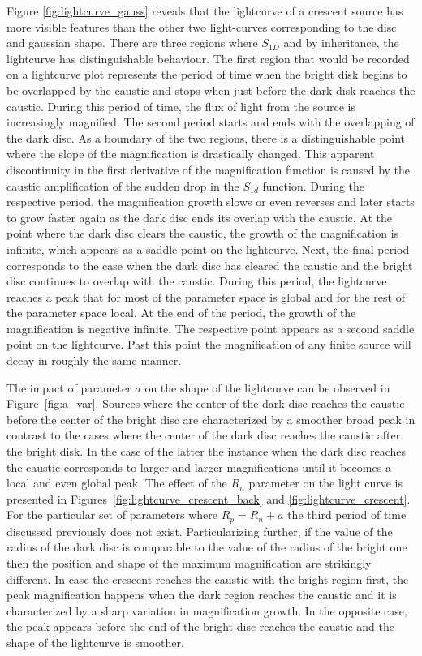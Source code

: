\documentclass[usenatbib]{mn2e}
\begin{document}
Figure \ref{fig:lightcurve_gauss} reveals that the 
lightcurve of a crescent source has more
visible features than the other two light-curves corresponding to the
disc and gaussian shape. There are three regions where $S_{1D}$ and by
inheritance, the lightcurve has distinguishable behaviour. The first
region that would be recorded on a lightcurve plot represents the
period of time when the bright disk begins to be overlapped by the
caustic and stops when just before the dark disk reaches the
caustic. During this period of time, the flux of light from the source
is increasingly magnified. The second period starts and ends with the
overlapping of the dark disc. As a boundary of the two regions, there
is a distinguishable point where the slope of the magnification is
drastically changed. This apparent discontinuity in the first
derivative of the magnification function is caused by the caustic
amplification of the sudden drop in the $S_{1d}$ function. During the
respective period, the magnification growth slows or even reverses
and later starts to grow faster again as
the dark disc ends its overlap with the caustic. At the point where
the dark disc clears the caustic, the growth of the magnification is
infinite, which appears as a saddle point on the lightcurve. Next, the
final period corresponds to the case when the dark disc has cleared
the caustic and the bright disc continues to overlap with the
caustic. During this period, the lightcurve reaches a peak that for
most of the parameter space is global and for the rest of the
parameter space local.  At the end of the period, the growth of the
magnification is negative infinite. The respective point appears as a
second saddle point on the lightcurve. Past this point the
magnification of any finite source will decay in roughly the same
manner.

The impact of parameter $a$ on the shape of the lightcurve can be
observed in Figure~\ref{fig:a_var}. Sources where the center of the
dark disc reaches the caustic before the center of the bright disc are
characterized by a smoother broad peak in contrast to the cases where
the center of the dark disc reaches the caustic after the bright disk.
In the case of the latter the instance when the dark disc reaches the
caustic corresponds to larger and larger magnifications until it
becomes a local and even global peak. The effect of the $R_n$
parameter on the light curve is presented in
Figures~\ref{fig:lightcurve_crescent_back} and
\ref{fig:lightcurve_crescent}. For the particular set of
parameters where $R_p = R_n +a$ the third period of time discussed
previously does not exist. Particularizing further, if the value of
the radius of the dark disc is comparable to the value of the radius
of the bright one then the position and shape of the maximum
magnification are strikingly different. In case the crescent reaches
the caustic with the bright region first, the peak magnification
happens when the dark region reaches the caustic and it is
characterized by a sharp variation in magnification growth. In the
opposite case, the peak appears before the end of the bright disc
reaches the caustic and the shape of the lightcurve is smoother.
\end{document}
